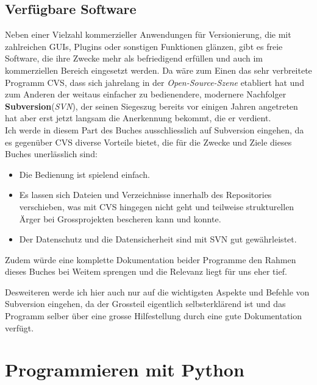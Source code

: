 \documentclass[b5paper,10pt,dvips,fleqn,titlepage,twoside]{book}
\begin{document}
\chapter{Verfügbare Software}
Neben einer Vielzahl kommerzieller Anwendungen für Versionierung, die mit zahlreichen GUIs, Plugins oder sonstigen Funktionen glänzen, gibt es freie Software, die ihre Zwecke mehr als befriedigend erfüllen und auch im kommerziellen Bereich eingesetzt werden.
Da wäre zum Einen das sehr verbreitete Programm CVS, dass sich jahrelang in der \emph{Open-Source-Szene} etabliert hat und zum Anderen der weitaus einfacher zu bedienendere, modernere Nachfolger \textbf{Subversion}(\textit{SVN}), der seinen Siegeszug bereits vor einigen Jahren angetreten hat aber erst jetzt langsam die Anerkennung bekommt, die er verdient.
\\
Ich werde in diesem Part des Buches ausschliesslich auf Subversion eingehen, da es gegenüber CVS diverse Vorteile bietet, die für die Zwecke und Ziele dieses Buches unerlässlich sind:\newline
\begin{itemize}
\item Die Bedienung ist spielend einfach.
\item Es lassen sich Dateien und Verzeichnisse innerhalb des Repositories verschieben, was mit CVS hingegen nicht geht und teilweise strukturellen Ärger bei Grossprojekten bescheren kann und konnte.
\item Der Datenschutz und die Datensicherheit sind mit SVN gut gewährleistet.
\end{itemize}
Zudem würde eine komplette Dokumentation beider Programme den Rahmen dieses Buches bei Weitem sprengen und die Relevanz liegt für uns eher tief.

Desweiteren werde ich hier auch nur auf die wichtigsten Aspekte und Befehle von Subversion eingehen, da der Grossteil eigentlich selbsterklärend ist und das Programm selber über eine grosse Hilfestellung durch eine gute Dokumentation verfügt.
\newline
\part{Programmieren mit Python}
\label{part:python}
\end{document}
